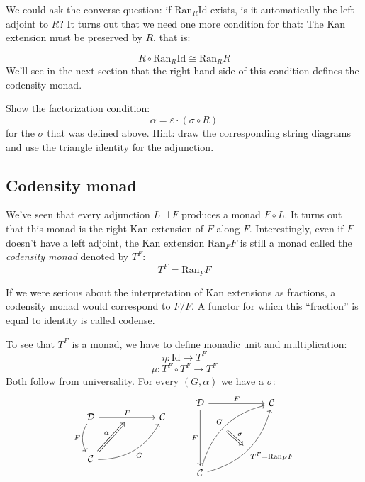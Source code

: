 \documentclass[DaoFP]{subfiles}
\begin{document}
We could ask the converse question: if $\text{Ran}_R \text{Id}$ exists, is it automatically the left adjoint to $R$? It turns out that we need one more condition for that: The Kan extension must be preserved by $R$, that is:

\[ R \circ \text{Ran}_R \text{Id} \cong \text{Ran}_R R \]
We'll see in the next section that the right-hand side of this condition defines the codensity monad.

\begin{exercise}
Show the factorization condition: 
\[ \alpha = \varepsilon \cdot (\sigma \circ R) \]
for the $\sigma$ that was defined above. Hint: draw the corresponding string diagrams and use the triangle identity for the adjunction.
\end{exercise}

 \subsection{Codensity monad}
 
 We've seen that every adjunction $L \dashv F$ produces a monad $F \circ L$. It turns out that this monad is the right Kan extension of $F$ along $F$. Interestingly, even if $F$ doesn't have a left adjoint, the Kan extension $\text{Ran}_F F$ is still a monad called the \emph{codensity monad} denoted by $T^F$:
 \[ T^F = \text{Ran}_F F \]
 
If we were serious about the interpretation of Kan extensions as fractions, a codensity monad would correspond to $F/F$. A functor for which this ``fraction'' is equal to identity is called codense.

To see that $T^F$ is a monad, we have to define monadic unit and multiplication:
\[ \eta \colon \text{Id} \to T^F \]
\[ \mu \colon T^F \circ T^F \to  T^F \]
 Both follow from universality. For every $(G, \alpha)$ we have a $\sigma$:
\[
 \begin{tikzcd} [row sep=1cm, column sep=1cm]
 \cat D
 \arrow[rr, "F", "" {name=ID, below} ]
 \arrow[d, bend right, "F"']
 && \cat C
 \\
 \cat C
  \arrow[urr, bend right, "G"']
 \arrow[Rightarrow, "\alpha",  to=ID]
 \end{tikzcd}
 \qquad
\begin{tikzcd}[row sep=2cm, column sep=2cm]
\cat D  \ar[d, "F"', "" {name=P}]
            \ar[r, "F", ""  {name=F, below, near start, bend right}]
&
\cat C
\\
\cat C
    \ar[ur, bend left, "G", "" {name=G, below}]
    \ar[ur, bend right, "T^F = \text{Ran}_F F"', "" {name=Ran}]
\arrow[Rightarrow, "\sigma", from=G, to=Ran]
\end{tikzcd}
\]
\end{document}
